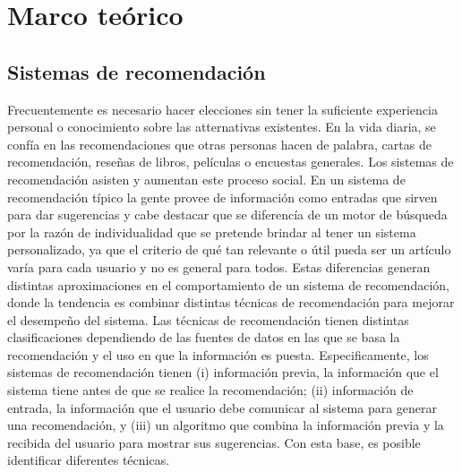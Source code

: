 \chapter {Marco teórico}
\section{Sistemas de recomendación}
Frecuentemente es necesario hacer elecciones sin tener la suficiente experiencia personal o conocimiento sobre las atternativas existentes. En la vida diaria, se confía en las recomendaciones que otras personas hacen de palabra, cartas de recomendación, reseñas de libros, películas o encuestas generales. \cite{4}
Los sistemas de recomendación asisten y aumentan este proceso social. En un sistema de recomendación típico la gente provee de información como entradas que sirven para dar sugerencias y cabe destacar que se diferencía de un motor de búsqueda por la razón de individualidad que se pretende brindar al tener un sistema personalizado, ya que el criterio de qué tan relevante o útil pueda ser un artículo varía para cada usuario y no es general para todos. Estas diferencias generan distintas aproximaciones en el comportamiento de un sistema de recomendación, donde la tendencia es combinar distintas técnicas de recomendación para mejorar el desempeño del sistema. Las técnicas de recomendación tienen distintas clasificaciones dependiendo de las fuentes de datos en las que se basa la recomendación y el uso en que la información es puesta. Especificamente, los sistemas de recomendación tienen (i) información previa, la información que el sistema tiene antes de que se realice la recomendación; (ii) información de entrada, la información que el usuario debe comunicar al sistema para generar una recomendación, y (iii) un algoritmo que combina la información previa y la recibida del usuario para mostrar sus sugerencias. Con esta base, es posible identificar diferentes técnicas.%

